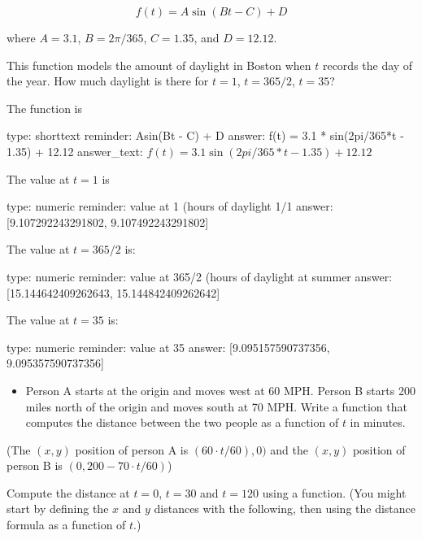 \documentclass[12pt]{article}
\begin{document}
\[
f(t) = A\sin(Bt - C) + D
\]

where $A=3.1$, $B=2\pi/365$, $C=1.35$, and $D=12.12$.

This function models the amount of daylight in Boston when $t$ records
the day of the year. How much daylight is there for $t=1$, $t=365/2$,
$t = 35$?

The function is

\begin{answer}
type: shorttext
reminder: Asin(Bt - C) + D
answer: f(t) = 3.1 * sin(2pi/365*t - 1.35) + 12.12
answer_text: \( f(t) = 3.1\sin(2pi/365*t - 1.35) + 12.12 \) 
\end{answer}

The value at $t=1$ is

\begin{answer}
    type: numeric
    reminder: value at 1 (hours of daylight 1/1
    answer: [9.107292243291802, 9.107492243291802]

\end{answer}

The value at $t=365/2$ is:

\begin{answer}
    type: numeric
    reminder: value at 365/2 (hours of daylight at summer
    answer: [15.144642409262643, 15.144842409262642]

\end{answer}

The value at $t=35$ is:

\begin{answer}
    type: numeric
    reminder: value at 35
    answer: [9.095157590737356, 9.095357590737356]

\end{answer}

\begin{itemize}
\itemsep1pt\parskip0pt
\item
  Person A starts at the origin and moves west at 60 MPH. Person B
  starts 200 miles north of the origin and moves south at 70 MPH. Write
  a function that computes the distance between the two people as a
  function of $t$ in minutes.
\end{itemize}

(The $(x,y)$ position of person A is $(60\cdot t/60), 0)$ and the
$(x,y)$ position of person B is $(0, 200 - 70 \cdot t/60)$)

Compute the distance at $t=0$, $t=30$ and $t=120$ using a function. (You
might start by defining the $x$ and $y$ distances with the following,
then using the distance formula as a function of $t$.)
\end{document}
